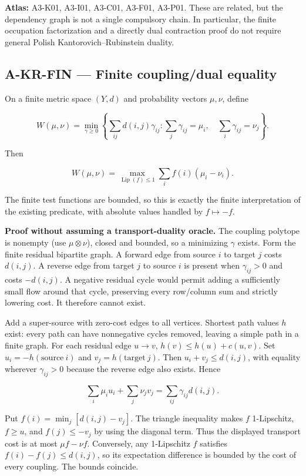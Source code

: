 \documentclass[
  11pt,
  a4paper,
]{article}
\newcommand{\codewrap}[1]{{\ttfamily\seqsplit{#1}}}
\begin{document}
\textbf{Atlas:} A3-K01, A3-I01, A3-C01, A3-F01, A3-P01. These are
related, but the dependency graph is not a single compulsory chain. In
particular, the finite occupation factorization and a directly dual
contraction proof do not require general Polish Kantorovich--Rubinstein
duality.

\subsection{A-KR-FIN --- Finite coupling/dual
equality}\label{a-kr-fin-finite-couplingdual-equality}

On a finite metric space \((Y,d)\) and probability vectors \(\mu,\nu\),
define

\[W(\mu,\nu)=\min_{\gamma\ge0}
\left\{\sum_{ij}d(i,j)\gamma_{ij}:
\sum_j\gamma_{ij}=\mu_i,\quad\sum_i\gamma_{ij}=\nu_j\right\}.\]

Then

\[W(\mu,\nu)=\max_{\operatorname{Lip}(f)\le1}
\sum_i f(i)(\mu_i-\nu_i).\]

The finite test functions are bounded, so this is exactly the finite
interpretation of the existing \codewrap{W1DualLE} predicate, with
absolute values handled by \(f\mapsto-f\).

\textbf{Proof without assuming a transport-duality oracle.} The coupling
polytope is nonempty (use \(\mu\otimes\nu\)), closed and bounded, so a
minimizing \(\gamma\) exists. Form the finite residual bipartite graph.
A forward edge from source \(i\) to target \(j\) costs \(d(i,j)\). A
reverse edge from target \(j\) to source \(i\) is present when
\(\gamma_{ij}>0\) and costs \(-d(i,j)\). A negative residual cycle would
permit adding a sufficiently small flow around that cycle, preserving
every row/column sum and strictly lowering cost. It therefore cannot
exist.

Add a super-source with zero-cost edges to all vertices. Shortest path
values \(h\) exist: every path can have nonnegative cycles removed,
leaving a simple path in a finite graph. For each residual edge
\(u\to v\), \(h(v)\le h(u)+c(u,v)\). Set \(u_i=-h(\mathrm{source}\ i)\)
and \(v_j=h(\mathrm{target}\ j)\). Then \(u_i+v_j\le d(i,j)\), with
equality wherever \(\gamma_{ij}>0\) because the reverse edge also
exists. Hence

\[\sum_i\mu_i u_i+\sum_j\nu_jv_j=\sum_{ij}\gamma_{ij}d(i,j).\]

Put \(f(i)=\min_j[d(i,j)-v_j]\). The triangle inequality makes \(f\)
1-Lipschitz, \(f\ge u\), and \(f(j)\le-v_j\) by using the diagonal term.
Thus the displayed transport cost is at most \(\mu f-\nu f\).
Conversely, any 1-Lipschitz \(f\) satisfies \(f(i)-f(j)\le d(i,j)\), so
its expectation difference is bounded by the cost of every coupling. The
bounds coincide.
\end{document}
